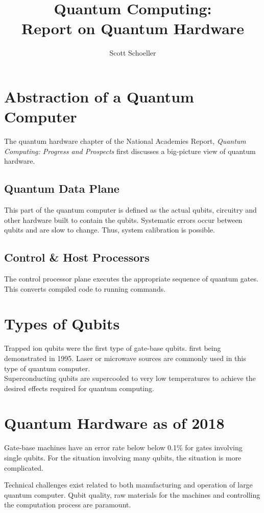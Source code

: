 \documentclass[12pt]{article}
\title{Quantum Computing:\\ Report on Quantum Hardware}
\author{Scott Schoeller}
\date{}
\begin{document}
\maketitle
\newpage

\begin{flushleft}
\section{Abstraction of a Quantum Computer}
The quantum hardware chapter of the National Academies Report, \textit{Quantum Computing: Progress and Prospects} \cite{grumbling_quantum_2019} first discusses a big-picture view of quantum hardware.

\subsection{Quantum Data Plane}
This part of the quantum computer is defined as the actual qubits, circuitry and other hardware built to contain the qubits. Systematic errors occur between qubits and are slow to change. Thus, system calibration is possible.

\subsection{Control \& Host Processors}
The control processor plane executes the appropriate sequence of quantum gates. This converts compiled code to running commands.

\section{Types of Qubits}
Trapped ion qubits were the first type of gate-base qubits. first being demonstrated in 1995. Laser or microwave sources are commonly used in this type of quantum computer.\\ 
Superconducting qubits are supercooled to very low temperatures to achieve the desired effects required for quantum computing.\\

\section{Quantum Hardware as of 2018}
\par{
Gate-base machines have an error rate below below 0.1\% for gates involving single qubits. For the situation involving many qubits, the situation is more complicated.
}
\par{
Technical challenges exist related to both manufacturing and operation of large quantum computer. Qubit quality, raw materials for the machines and controlling the computation process are paramount.
}

\newpage



\end{flushleft}
\end{document}
